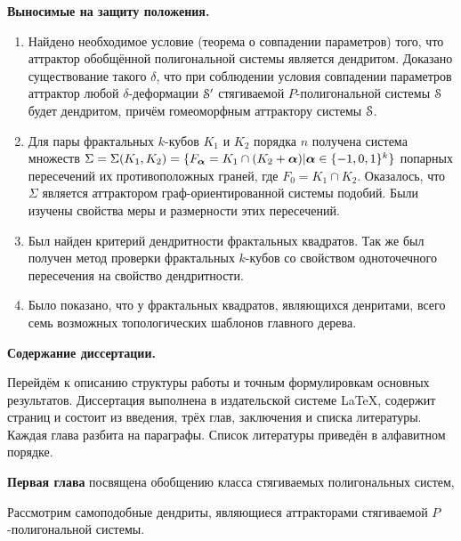 \begin{center}
\textbf{Выносимые на защиту положения.}
\end{center}

\begin{enumerate}
\item Найдено необходимое условие (теорема о совпадении параметров) того, что аттрактор обобщённой полигональной системы является дендритом.
Доказано существование такого $\delta$, что при соблюдении условия совпадении параметров аттрактор любой $\delta$-деформации ${\EuScript S}'$ стягиваемой $P$-полигональной системы ${\EuScript S}$ будет дендритом, причём гомеоморфным аттрактору системы ${\EuScript S}$.

\item Для пары фрактальных $k$-кубов $K_1$ и $K_2$ порядка $n$ получена система множеств $\Sigma=\Sigma(K_1,K_2)=\{F_{\bm{\alpha}}=K_1\cap(K_2+{\bm{\alpha}}) | {\bm{\alpha}}\in\{-1,0,1\}^k\}$ попарных пересечений их противоположных граней, где $F_0=K_1\cap K_2$. 
Оказалось, что $\Sigma$ является аттрактором граф-ориентированной системы подобий.
Были изучены свойства меры и размерности этих пересечений.

\item Был найден критерий дендритности фрактальных квадратов. Так же был получен метод проверки фрактальных $k$-кубов со свойством одноточечного пересечения на свойство дендритности.

\item Было показано, что у фрактальных квадратов, являющихся денритами, всего семь возможных топологических шаблонов главного дерева.
\end{enumerate}

\begin{center}
    \textbf{Содержание диссертации.}
\end{center}

Перейдём к описанию структуры работы и точным формулировкам основных результатов.
Диссертация выполнена в издательской системе \LaTeX, содержит  страниц и состоит из введения, трёх глав, заключения и списка литературы.
Каждая глава разбита на параграфы.
Список литературы приведён в алфавитном порядке.

\textbf{Первая глава} посвящена обобщению класса стягиваемых полигональных систем,

Рассмотрим самоподобные дендриты, являющиеся аттракторами стягиваемой $P$-полигональной системы.



